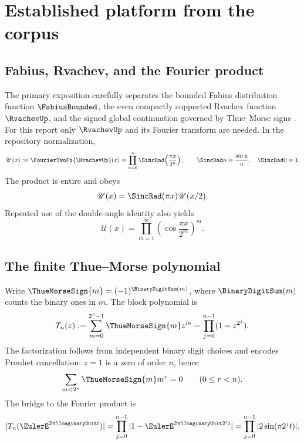 \documentclass[11pt,oneside]{article}
\theoremstyle{definition}
\theoremstyle{remark}
\begin{document}
\section{Established platform from the corpus}\label{p2:sec:platform}

\subsection{Fabius, Rvachev, and the Fourier product}

The primary exposition carefully separates the bounded Fabius distribution
function $\FabiusBounded$, the even compactly supported Rvachev function $\RvachevUp$, and the signed
global continuation governed by Thue--Morse signs \cite{p2:proveit,p2:ariascompact,p2:ariasarith}.
For this report only $\RvachevUp$ and its Fourier transform are needed. In the repository
normalization,
\begin{equation}
 \mathscr U(x):=\FourierTwoPi{\RvachevUp}(x)
 =\prod_{n=0}^{\infty}\SincRad\!\left(\frac{\pi x}{2^n}\right),
 \qquad \SincRad u=\frac{\sin u}{u},\quad\SincRad0=1.
 \label{p2:eq:U-product}
\end{equation}
The product is entire and obeys
\begin{equation}
 \mathscr U(x)=\SincRad(\pi x)\mathscr U(x/2).
 \label{p2:eq:U-refine}
\end{equation}
Repeated use of the double-angle identity also yields
\begin{equation}
 \mathscr U(x)=\prod_{m=1}^{\infty}\left(\cos\frac{\pi x}{2^m}\right)^m.
 \label{p2:eq:U-cos}
\end{equation}

\subsection{The finite Thue--Morse polynomial}

Write $\ThueMorseSign{m}=(-1)^{\BinaryDigitSum(m)}$, where $\BinaryDigitSum(m)$ counts the binary ones in $m$. The
block polynomial is
\begin{equation}
 T_n(z):=\sum_{m=0}^{2^n-1}\ThueMorseSign{m}z^m
       =\prod_{j=0}^{n-1}(1-z^{2^j}).
 \label{p2:eq:TM-poly}
\end{equation}
The factorization follows from independent binary digit choices and encodes Prouhet
cancellation: $z=1$ is a zero of order $n$, hence
\[
 \sum_{m<2^n}\ThueMorseSign{m}m^r=0\qquad(0\le r<n).
\]
The bridge to the Fourier product is
\begin{equation}
 |T_n(\EulerE^{2\pi\ImaginaryUnit t})|
 =\prod_{j=0}^{n-1}|1-\EulerE^{2\pi\ImaginaryUnit2^jt}|
 =\prod_{j=0}^{n-1}|2\sin(\pi2^jt)|.
 \label{p2:eq:T-Q}
\end{equation}
\end{document}
